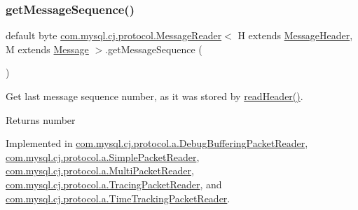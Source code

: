 \subsubsection{\texorpdfstring{get\+Message\+Sequence()}{getMessageSequence()}}
{\footnotesize\ttfamily default byte \mbox{\hyperlink{interfacecom_1_1mysql_1_1cj_1_1protocol_1_1_message_reader}{com.\+mysql.\+cj.\+protocol.\+Message\+Reader}}$<$ H extends \mbox{\hyperlink{interfacecom_1_1mysql_1_1cj_1_1protocol_1_1_message_header}{Message\+Header}}, M extends \mbox{\hyperlink{interfacecom_1_1mysql_1_1cj_1_1protocol_1_1_message}{Message}} $>$.get\+Message\+Sequence (\begin{DoxyParamCaption}{ }\end{DoxyParamCaption})}

Get last message sequence number, as it was stored by \mbox{\hyperlink{interfacecom_1_1mysql_1_1cj_1_1protocol_1_1_message_reader_a09745b0e30f74fa13e2b32f22ce70cbb}{read\+Header()}}.

\begin{DoxyReturn}{Returns}
number 
\end{DoxyReturn}


Implemented in \mbox{\hyperlink{classcom_1_1mysql_1_1cj_1_1protocol_1_1a_1_1_debug_buffering_packet_reader_a221efd81777e2a3fcceb0368f6baf0db}{com.\+mysql.\+cj.\+protocol.\+a.\+Debug\+Buffering\+Packet\+Reader}}, \mbox{\hyperlink{classcom_1_1mysql_1_1cj_1_1protocol_1_1a_1_1_simple_packet_reader_ac89192017a4a7eb78ab9679925857fd6}{com.\+mysql.\+cj.\+protocol.\+a.\+Simple\+Packet\+Reader}}, \mbox{\hyperlink{classcom_1_1mysql_1_1cj_1_1protocol_1_1a_1_1_multi_packet_reader_a237c52b4c174c917ec8a15a5eb2839d1}{com.\+mysql.\+cj.\+protocol.\+a.\+Multi\+Packet\+Reader}}, \mbox{\hyperlink{classcom_1_1mysql_1_1cj_1_1protocol_1_1a_1_1_tracing_packet_reader_a35edadc0834493cc9536aa1c624c13ac}{com.\+mysql.\+cj.\+protocol.\+a.\+Tracing\+Packet\+Reader}}, and \mbox{\hyperlink{classcom_1_1mysql_1_1cj_1_1protocol_1_1a_1_1_time_tracking_packet_reader_a436548845d1e371699d0cad877dc717b}{com.\+mysql.\+cj.\+protocol.\+a.\+Time\+Tracking\+Packet\+Reader}}.

\mbox{\label{interfacecom_1_1mysql_1_1cj_1_1protocol_1_1_message_reader_a09745b0e30f74fa13e2b32f22ce70cbb}} 
